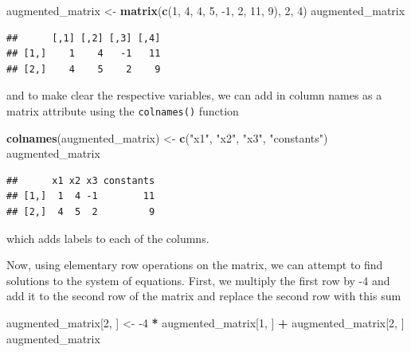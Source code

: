 \documentclass[
]{book}
\newenvironment{Shaded}{\begin{snugshade}}{\end{snugshade}}
\newcommand{\DecValTok}[1]{\textcolor[rgb]{0.00,0.00,0.81}{#1}}
\newcommand{\KeywordTok}[1]{\textcolor[rgb]{0.13,0.29,0.53}{\textbf{#1}}}
\newcommand{\NormalTok}[1]{#1}
\newcommand{\OperatorTok}[1]{\textcolor[rgb]{0.81,0.36,0.00}{\textbf{#1}}}
\newcommand{\StringTok}[1]{\textcolor[rgb]{0.31,0.60,0.02}{#1}}
\theoremstyle{definition}
\theoremstyle{definition}
\theoremstyle{definition}
\theoremstyle{definition}
\theoremstyle{remark}
\begin{document}
\begin{Shaded}
\begin{Highlighting}[]
\NormalTok{augmented_matrix <-}\StringTok{ }\KeywordTok{matrix}\NormalTok{(}\KeywordTok{c}\NormalTok{(}\DecValTok{1}\NormalTok{, }\DecValTok{4}\NormalTok{, }\DecValTok{4}\NormalTok{, }\DecValTok{5}\NormalTok{, }\DecValTok{-1}\NormalTok{, }\DecValTok{2}\NormalTok{, }\DecValTok{11}\NormalTok{, }\DecValTok{9}\NormalTok{), }\DecValTok{2}\NormalTok{, }\DecValTok{4}\NormalTok{)}
\NormalTok{augmented_matrix}
\end{Highlighting}
\end{Shaded}

\begin{verbatim}
##      [,1] [,2] [,3] [,4]
## [1,]    1    4   -1   11
## [2,]    4    5    2    9
\end{verbatim}

and to make clear the respective variables, we can add in column names as a matrix attribute using the \texttt{colnames()} function

\begin{Shaded}
\begin{Highlighting}[]
\KeywordTok{colnames}\NormalTok{(augmented_matrix) <-}\StringTok{ }\KeywordTok{c}\NormalTok{(}\StringTok{"x1"}\NormalTok{, }\StringTok{"x2"}\NormalTok{, }\StringTok{"x3"}\NormalTok{, }\StringTok{"constants"}\NormalTok{)}
\NormalTok{augmented_matrix}
\end{Highlighting}
\end{Shaded}

\begin{verbatim}
##      x1 x2 x3 constants
## [1,]  1  4 -1        11
## [2,]  4  5  2         9
\end{verbatim}

which adds labels to each of the columns.

Now, using elementary row operations on the matrix, we can attempt to find solutions to the system of equations. First, we multiply the first row by -4 and add it to the second row of the matrix and replace the second row with this sum

\begin{Shaded}
\begin{Highlighting}[]
\NormalTok{augmented_matrix[}\DecValTok{2}\NormalTok{, ] <-}\StringTok{ }\DecValTok{-4} \OperatorTok{*}\StringTok{ }\NormalTok{augmented_matrix[}\DecValTok{1}\NormalTok{, ] }\OperatorTok{+}\StringTok{ }\NormalTok{augmented_matrix[}\DecValTok{2}\NormalTok{, ]}
\NormalTok{augmented_matrix}
\end{Highlighting}
\end{Shaded}
\end{document}
